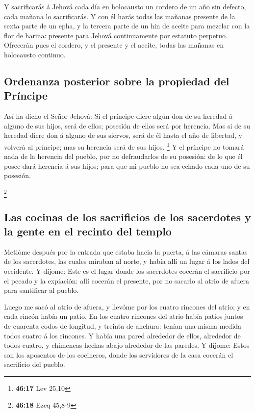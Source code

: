  Y sacrificarás á Jehová cada día en holocausto un
cordero de un año sin defecto, cada mañana lo sacrificarás.
 Y con él harás todas las mañanas presente de la sexta
parte de un epha, y la tercera parte de un hin de aceite para mezclar
con la flor de harina: presente para Jehová continuamente por estatuto
perpetuo.  Ofrecerán pues el cordero, y el presente y el
aceite, todas las mañanas en holocausto continuo.

\hypertarget{ordenanza-posterior-sobre-la-propiedad-del-pruxedncipe}{%
\subsection{Ordenanza posterior sobre la propiedad del
Príncipe}\label{ordenanza-posterior-sobre-la-propiedad-del-pruxedncipe}}

 Así ha dicho el Señor Jehová: Si el príncipe diere algún
don de su heredad á alguno de sus hijos, será de ellos; posesión de
ellos será por herencia.  Mas si de su heredad diere don
á alguno de sus siervos, será de él hasta el año de libertad, y volverá
al príncipe; mas su herencia será de sus hijos. \footnote{\textbf{46:17}
  Lev 25,10}  Y el príncipe no tomará nada de la herencia
del pueblo, por no defraudarlos de su posesión: de lo que él posee dará
herencia á sus hijos; para que mi pueblo no sea echado cada uno de su
posesión.

\footnote{\textbf{46:18} Ezeq 45,8-9}

\hypertarget{las-cocinas-de-los-sacrificios-de-los-sacerdotes-y-la-gente-en-el-recinto-del-templo}{%
\subsection{Las cocinas de los sacrificios de los sacerdotes y la gente
en el recinto del
templo}\label{las-cocinas-de-los-sacrificios-de-los-sacerdotes-y-la-gente-en-el-recinto-del-templo}}

 Metióme después por la entrada que estaba hacia la
puerta, á las cámaras santas de los sacerdotes, las cuales miraban al
norte, y había allí un lugar á los lados del occidente. 
Y díjome: Este es el lugar donde los sacerdotes cocerán el sacrificio
por el pecado y la expiación: allí cocerán el presente, por no sacarlo
al atrio de afuera para santificar al pueblo.

 Luego me sacó al atrio de afuera, y llevóme por los
cuatro rincones del atrio; y en cada rincón había un patio.
 En los cuatro rincones del atrio había patios juntos de
cuarenta codos de longitud, y treinta de anchura: tenían una misma
medida todos cuatro á los rincones.  Y había una pared
alrededor de ellos, alrededor de todos cuatro, y chimeneas hechas abajo
alrededor de las paredes.  Y díjome: Estos son los
aposentos de los cocineros, donde los servidores de la casa cocerán el
sacrificio del pueblo.

